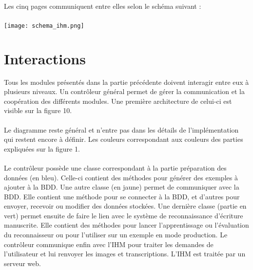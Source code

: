\paragraph{}
Les cinq pages communiquent entre elles selon le schéma suivant :

\paragraph{}
\begin{mdframed}[frametitle={Figure 10 : Organisation de l'IHM}, innerbottommargin=10]
\begin{center}
\texttt{[image: schema\_ihm.png]}
\end{center}
\end{mdframed}

\section{Interactions}

Tous les modules présentés dans la partie précédente doivent interagir entre
eux à plusieurs niveaux. Un contrôleur général permet de gérer la communication
et la coopération des différents modules. Une première architecture de celui-ci
est visible sur la figure 10.

\paragraph{}
Le diagramme reste général et n’entre pas dans les détails de l’implémentation
qui restent encore à définir. Les couleurs correspondant aux couleurs des
parties expliquées sur la figure 1.

\paragraph{}
Le contrôleur possède une classe correspondant à la partie préparation des
données (en bleu). Celle-ci contient des méthodes pour générer des exemples
à ajouter à la BDD. Une autre classe (en jaune) permet de communiquer avec
la BDD. Elle contient une méthode pour se connecter à la BDD, et d’autres pour
envoyer, recevoir ou modifier des données stockées. Une dernière classe
(partie en vert) permet ensuite de faire le lien avec le système de
reconnaissance d’écriture manuscrite. Elle contient des méthodes pour lancer
l’apprentissage ou l’évaluation du reconnaisseur ou pour l’utiliser sur un
exemple en mode production. Le contrôleur communique enfin avec l’IHM pour
traiter les demandes de l’utilisateur et lui renvoyer les images et
transcriptions. L’IHM est traitée par un serveur web.


